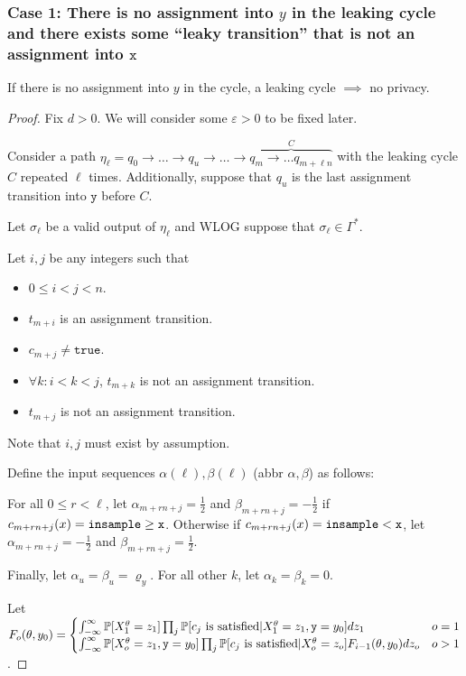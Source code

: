 \subsubsection{Case 1: There is no assignment into $y$ in the leaking cycle and there exists some ``leaky transition'' that is not an assignment into $\texttt{x}$}

\begin{thm}
	If there is no assignment into $y$ in the cycle, a leaking cycle $\implies$ no privacy. 
\end{thm}
\begin{proof}


	Fix $d>0$. We will consider some $\varepsilon>0$ to be fixed later. 

	Consider a path $\eta_\ell = q_0\to\ldots\to q_u\to \ldots\to \overbrace{q_m\to \ldots q_{m+\ell n}}^{C}$ with the leaking cycle $C$ repeated $\ell$ times. Additionally, suppose that $q_u$ is the last assignment transition into $\texttt{y}$ before $C$. 

	Let $\sigma_\ell$ be a valid output of $\eta_\ell$ and WLOG suppose that $\sigma_\ell\in\Gamma^*$. 

		
	Let $i, j$ be any integers such that \begin{itemize}
		\item $0\leq i <j<n$.
		\item $t_{m+i}$ is an assignment transition.
		\item $c_{m+j}\neq \texttt{true}$.
		\item $\forall k:i<k<j$, $t_{m+k}$ is not an assignment transition.
		\item $t_{m+j}$ is not an assignment transition. 
	\end{itemize}

	Note that $i, j$ must exist by assumption. 	

	Define the input sequences $\alpha(\ell), \beta(\ell)$ (abbr $\alpha, \beta$) as follows:  
	
	For all $0\leq r < \ell$, let $\alpha_{m+rn+j} = \frac{1}{2}$ and $\beta_{m+rn+j} = -\frac{1}{2}$ if $c_{m+rn+j}(x) = \gguard[\texttt{x}]$. Otherwise if $c_{m+rn+j}(x)=\lguard[\texttt{x}]$, let $\alpha_{m+rn+j}=-\frac{1}{2}$ and $\beta_{m+rn+j} =\frac{1}{2}$.
	
	Finally, let $\alpha_u = \beta_u = \varrho_y$. For all other $k$, let $\alpha_k=\beta_k=0$. 

Let $F_o(\theta, y_0) = \begin{cases}
	\int_{-\infty}^\infty \PP[X_1^\theta=z_1]\prod_j \PP[c_j\text{ is satisfied}|X_1^\theta = z_1, \texttt{y}=y_0]dz_1 & o = 1\\
	\int_{-\infty}^\infty \PP[X_o^\theta=z_1, \texttt{y}=y_0]\prod_j \PP[c_j\text{ is satisfied}|X_o^\theta = z_o] F_{i-1}(\theta, y_0)dz_o & o > 1
\end{cases}$.


\end{proof}
